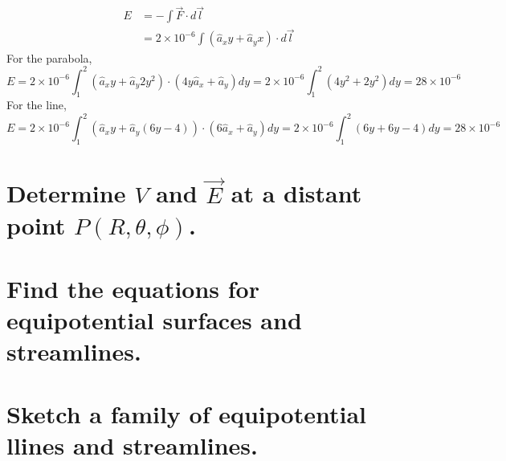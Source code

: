 \documentclass[answers]{exam}
\begin{document}
\begin{questions}
\begin{solution}
	\begin{align*}
		E &= -\int \vec{F}\cdot d\vec{l} \\
		  &= 2\times10^{-6} \int (\hat{a}_xy + \hat{a}_yx)\cdot d\vec{l}
	\end{align*}
	For the parabola,
	$$E = 2\times10^{-6} \int_1^2 (\hat{a}_xy + \hat{a}_y2y^2)\cdot (4y\hat{a}_x + \hat{a}_y)dy = 2\times10^{-6} \int_1^2 (4y^2 + 2y^2)dy = 28\times10^{-6}$$
	For the line,
	$$E = 2\times10^{-6} \int_1^2 (\hat{a}_xy + \hat{a}_y(6y-4)) \cdot (6\hat{a}_x + \hat{a}_y)dy = 2\times10^{-6} \int_1^2 (6y+6y-4)dy = 28\times10^{-6}$$
\end{solution}


\begin{parts}
	\part{Determine $V$ and $\vec{E}$ at a distant point $P(R,\theta,\phi)$.}
	\part{Find the equations for equipotential surfaces and streamlines.}
	\part{Sketch a family of equipotential llines and streamlines.}
\end{parts}


\end{questions}
\end{document}
